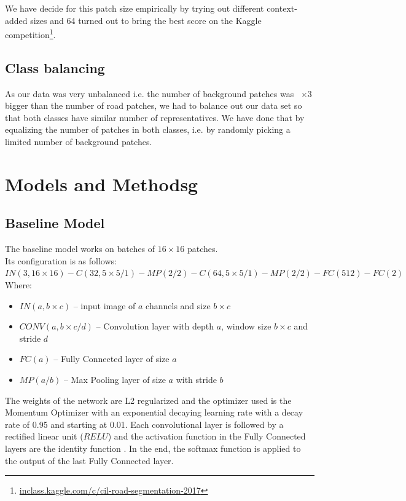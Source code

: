 \documentclass[10pt,conference,compsocconf]{IEEEtran}
\begin{document}
We have decide for this patch size empirically by trying out different context-added sizes and 64 turned out to bring the
best score on the Kaggle competition\footnote{\url{inclass.kaggle.com/c/cil-road-segmentation-2017}}.

\subsection{Class balancing}
\label{sec:balance}
As our data was very unbalanced i.e. the number of background patches was ~$\times3$ bigger than the number of road patches, 
we had to balance out our data set so that both classes have similar number of representatives. We have done that by 
equalizing the number of patches in both classes, i.e. by randomly picking a limited number of background patches.



\section{Models and Methodsg}
\label{sec:model_and_methods}
\subsection{Baseline Model}
The baseline model works on batches of $16 \times 16$ patches.\\
 Its configuration is as follows:
 $IN(3, 16\times16)
-C(32, 5\times5 /1) - MP(2 / 2) - C(64, 5\times5 /1) - MP(2 / 2)
-FC(512)-FC(2)$
Where:
\begin{itemize}
\item $IN(a,b\times c)$ -- input image of $a$ channels and size $b \times  c$
\item $CONV(a,b\times c / d)$ -- Convolution layer with depth $a$, window size $b\times c$ and stride $d$
\item $FC(a)$ -- Fully Connected layer of size $a$
\item $MP(a / b)$ -- Max Pooling layer of size $a$ with stride $b$
\end{itemize}

The weights of the network are L2 regularized and the optimizer used is the Momentum Optimizer  with an exponential decaying learning rate with a decay rate of 0.95 and starting at 0.01.
Each convolutional layer is followed by a rectified linear unit ($RELU$) and the activation function in the Fully Connected layers are the identity function .
In the end, the softmax function is applied to the output of the last Fully Connected layer. 
\end{document}
